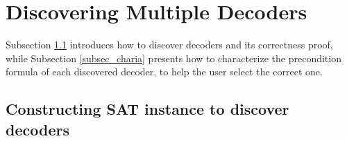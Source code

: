 \documentclass[journal]{IEEEtran}
\begin{document}
%
%
%
%
%


\section{Discovering Multiple Decoders}\label{sec_fdtest}
Subsection \ref{subsec_fd_detail} introduces how to discover decoders and its correctness proof,
while Subsection \ref{subsec_charia} presents how to characterize the precondition formula of each discovered decoder,
to help the user select the correct one.

\subsection{Constructing SAT instance to discover decoders}\label{subsec_fd_detail}
%
\end{document}
